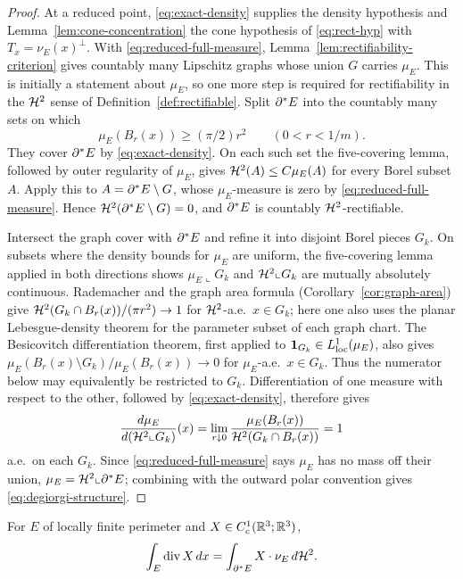 \begin{proof}
At a reduced point, \eqref{eq:exact-density} supplies the density hypothesis
and Lemma~\ref{lem:cone-concentration} the cone hypothesis of
\eqref{eq:rect-hyp} with $T_x=\nu_E(x)^\perp$.  With
\eqref{eq:reduced-full-measure}, Lemma~\ref{lem:rectifiability-criterion}
gives countably many Lipschitz graphs whose union $G$ carries $\mu_E$.
This is initially a statement about $\mu_E$, so one more step is required for
rectifiability in the $\mathcal H^2$ sense of Definition~\ref{def:rectifiable}.
Split $\partial^* E$ into the countably many sets on which
\[
 \mu_E(B_r(x))\ge(\pi/2)r^2\qquad(0<r<1/m).
\]
They cover $\partial^* E$ by \eqref{eq:exact-density}.  On each such set the
five-covering lemma, followed by outer regularity of $\mu_E$, gives
$\mathcal H^2(A)\le C\mu_E(A)$ for every Borel subset $A$.  Apply this to
$A=\partial^* E\setminus G$, whose $\mu_E$-measure is zero by
\eqref{eq:reduced-full-measure}.  Hence
$\mathcal H^2(\partial^* E\setminus G)=0$, and $\partial^* E$ is countably
$\mathcal H^2$-rectifiable.

Intersect the graph cover with $\partial^* E$ and refine it into disjoint Borel
pieces $G_k$.  On subsets where
the density bounds for $\mu_E$ are uniform, the five-covering lemma applied
in both directions shows $\mu_E\llcorner G_k$ and $\mathcal H^2\llcorner G_k$ are
mutually absolutely continuous.  Rademacher and the graph area formula
(Corollary~\ref{cor:graph-area}) give
$\mathcal H^2(G_k\cap B_r(x))/(\pi r^2)\to1$ for $\mathcal H^2$-a.e.\ $x\in G_k$; here one
also uses the planar Lebesgue-density theorem for the parameter subset of
each graph chart.  The
Besicovitch differentiation theorem, first applied to
$\mathbf 1_{G_k}\in L^1_{\mathrm{loc}}(\mu_E)$, also gives
$\mu_E(B_r(x)\setminus G_k)/\mu_E(B_r(x))\to0$ for
$\mu_E$-a.e.\ $x\in G_k$.  Thus the numerator below may equivalently be
restricted to $G_k$.  Differentiation of one measure with respect to the
other, followed by \eqref{eq:exact-density}, therefore gives
\[
  \frac{d\mu_E}{d(\mathcal H^2\llcorner G_k)}(x)
  =\lim_{r\downarrow0}\frac{\mu_E(B_r(x))}{\mathcal H^2(G_k\cap B_r(x))}=1
\]
a.e.\ on each $G_k$.  Since \eqref{eq:reduced-full-measure} says $\mu_E$ has
no mass off their union, $\mu_E=\mathcal H^2\llcorner\partial^* E$; combining with the
outward polar convention gives \eqref{eq:degiorgi-structure}.
\end{proof}

\begin{theorem}\label{thm:gauss-green}
For $E$ of locally finite perimeter and $X\in C^1_c(\mathbb R^3;\mathbb R^3)$,
\begin{equation}\label{eq:gauss-green}
  \int_E\operatorname{div} X\,dx=\int_{\partial^* E}X\cdot\nu_E\,d\mathcal H^2 .
\end{equation}
\end{theorem}

